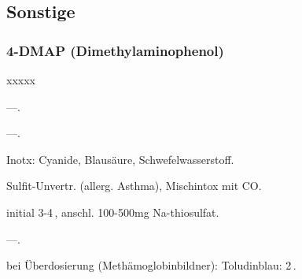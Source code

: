 \subsection{Sonstige}


\subsubsection{4-DMAP (Dimethylaminophenol)}


\begin{labeling}[~]{xxxxx}
  \item[Präparate:]---.
  \item[Beschreibung:] ---.
  \item[I:]    Inotx: Cyanide, Blausäure,
Schwefelwasserstoff.
  \item[KI:]   Sulfit-Unvertr. (allerg. Asthma), Mischintox mit CO.
  \item[Rx:]   initial 3-4\,, anschl. 100-500mg Na-thiosulfat.
  \item[Cave:] ---.
  \item[Anm:]   bei Überdosierung (Methämoglobinbildner): Toludinblau: 2\,.
\end{labeling}




